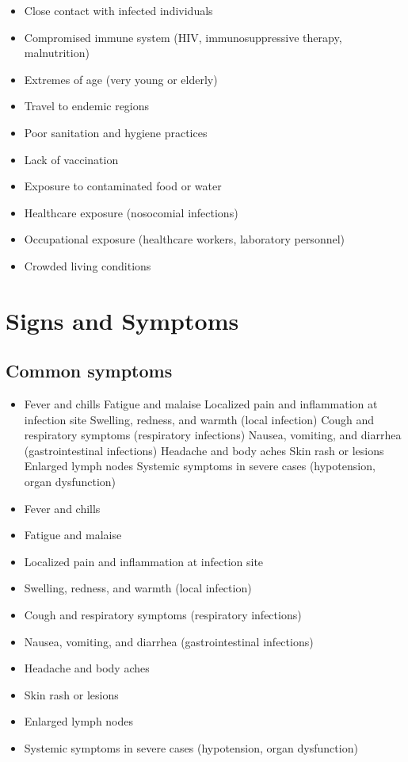 \begin{itemize}[noitemsep]
  \item Close contact with infected individuals
  \item Compromised immune system (HIV, immunosuppressive therapy, malnutrition)
  \item Extremes of age (very young or elderly)
  \item Travel to endemic regions
  \item Poor sanitation and hygiene practices
  \item Lack of vaccination
  \item Exposure to contaminated food or water
  \item Healthcare exposure (nosocomial infections)
  \item Occupational exposure (healthcare workers, laboratory personnel)
  \item Crowded living conditions
\end{itemize}
\section{Signs and Symptoms}

\subsection{Common symptoms}
\begin{itemize}[noitemsep]
  \item Fever and chills Fatigue and malaise Localized pain and inflammation at infection site Swelling, redness, and warmth (local infection) Cough and respiratory symptoms (respiratory infections) Nausea, vomiting, and diarrhea (gastrointestinal infections) Headache and body aches Skin rash or lesions Enlarged lymph nodes Systemic symptoms in severe cases (hypotension, organ dysfunction)
  \item Fever and chills
  \item Fatigue and malaise
  \item Localized pain and inflammation at infection site
  \item Swelling, redness, and warmth (local infection)
  \item Cough and respiratory symptoms (respiratory infections)
  \item Nausea, vomiting, and diarrhea (gastrointestinal infections)
  \item Headache and body aches
  \item Skin rash or lesions
  \item Enlarged lymph nodes
  \item Systemic symptoms in severe cases (hypotension, organ dysfunction)
\end{itemize}

